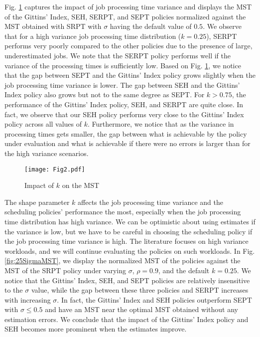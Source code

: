 Fig. \ref{fig:5ShapeMST} captures the impact of job processing time variance and displays the MST of the Gittins' Index, SEH, SERPT, and SEPT policies normalized against the MST obtained with SRPT with $\sigma$ having the default value of $0.5$. We observe that for a high variance job processing time distribution ($k = 0.25$), SERPT performs very poorly compared to the other policies due to the presence of large, underestimated jobs. We note that the SERPT policy performs well if the variance of the processing times is sufficiently low. Based on Fig. \ref{fig:5ShapeMST}, we notice that the gap between SEPT and the Gittins' Index policy grows slightly when the job processing time variance is lower. The gap between SEH and the Gittins’ Index policy also grows but not to the same degree as SEPT. For $k > 0.75$, the performance of the Gittins' Index policy, SEH, and SERPT are quite close. In fact, we observe that our SEH policy performs very close to the Gittins' Index policy across all values of $k$. Furthermore, we notice that as the variance in processing times gets smaller, the gap between what is achievable by the policy under evaluation and what is achievable if there were no errors is larger than for the high variance scenarios. 

\begin{figure}[ht]

  \texttt{[image: Fig2.pdf]}
  \centering
    \caption{Impact of $k$ on the MST}
  \label{fig:5ShapeMST}

\end{figure}







 
The shape parameter $k$ affects the job processing time variance and the scheduling policies' performance the most, especially when the job processing time distribution has high variance. We can be optimistic about using estimates if the variance is low, but we have to be careful in choosing the scheduling policy if the job processing time variance is high. The literature focuses on high variance workloads, and we will continue evaluating the policies on such workloads. In Fig. \ref{fig:25SigmaMST}, we display the normalized MST of the policies against the MST of the SRPT policy under varying $\sigma$, $ \rho = 0.9$, and the default $ k = 0.25$. We notice that the Gittins' Index, SEH, and SEPT policies are relatively insensitive to the $\sigma$ value, while the gap between these three policies and SERPT increases with increasing $\sigma$. In fact, the Gittins' Index and SEH policies outperform SEPT with $\sigma \le 0.5$ and have an MST near the optimal MST obtained without any estimation errors. We conclude that the impact of the Gittins' Index policy and SEH becomes more prominent when the estimates improve.




